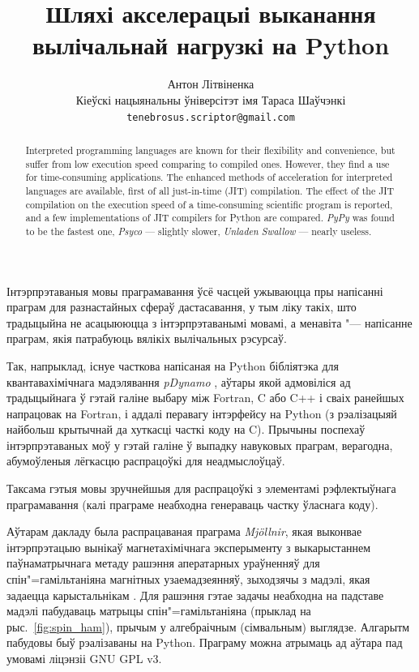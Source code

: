 \documentclass[a4paper,12pt]{article}
\newcommand{\progname}{\textit} %
\begin{document}
\renewcommand{\figurename}{Рыс.} %
\renewcommand{\abstractname}{Анатацыя}
\renewcommand{\refname}{Літаратура}

\title{Шляхі акселерацыі выканання вылічальнай нагрузкі на Python}
\author{Антон Літвіненка\\ \small Кіеўскі нацыянальны ўніверсітэт імя Тараса Шаўчэнкі\\ \small \texttt{tenebrosus.scriptor@gmail.com}}
\date{}
\maketitle

\begin{abstract}
Interpreted programming languages are known for their fle\-xibility and convenience, but suffer from low execution speed comparing to compiled ones. However, they find a use for time-consuming applications. The enhanced methods of acceleration for interpreted languages are available, first of all just-in-time (JIT) compilation. The effect of the JIT compilation on the execution speed of a time-consuming scientific program is re\-ported, and a few imp\-le\-mentations of JIT compilers for Python are compared. \progname{PyPy} was found to be the fastest one, \progname{Psyco} --- slightly slower, \progname{Unladen Swallow} --- nearly useless.
\end{abstract}

Інтэрпрэтаваныя мовы праграмавання ўсё часцей ужываюцца пры напісанні праграм для разнастайных сфераў дастасавання, у тым ліку такіх, што традыцыйна не асацыююцца з інтэрпрэтаванымі мовамі, а менавіта "--- напісанне праграм, якія патрабуюць вялікіх вылічальных рэсурсаў.

Так, напрыклад, існуе часткова напісаная на Python бібліятэка для квантавахімічнага мадэлявання \progname{pDynamo} \cite{pDynamo}, аўтары якой адмовіліся ад традыцыйнага ў гэтай галіне выбару між Fortran, C або C++ і сваіх ранейшых напрацовак на Fortran, і аддалі перавагу інтэрфейсу на Python (з рэалізацыяй найбольш крытычнай да хуткасці часткі коду на C). Прычыны поспехаў інтэрпрэтаваных моў у гэтай галіне ў выпадку навуковых праграм, верагодна, абумоўленыя лёгкасцю распрацоўкі для неадмыслоўцаў.

Таксама гэтыя мовы зручнейшыя для распрацоўкі з элементамі рэфлектыўнага праграмавання (калі праграме неабходна генераваць частку ўласнага коду).

Аўтарам дакладу была распрацаваная праграма \progname{Mj{\"o}llnir}, якая выконвае інтэрпрэтацыю вынікаў магнетахімічнага эксперыменту з выкарыстаннем паўнаматрычнага метаду рашэння аператарных ураўненняў для спін"=гамільтаніяна магнітных узаемадзеянняў, зыходзячы з мадэлі, якая задаецца карыстальнікам \cite{Mjollnir}. Для рашэння гэтае задачы неабходна на падставе мадэлі пабудаваць матрыцы спін"=гамільтаніяна (прыклад на рыс.~\ref{fig:spin_ham}), прычым у алгебраічным (сімвальным) выглядзе. Алгарытм пабудовы быў рэалізаваны на Python. Праграму можна атрымаць ад аўтара пад умовамі ліцэнзіі GNU GPL v3.
\end{document}

